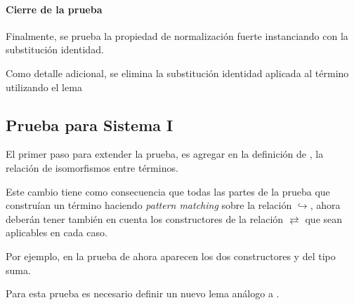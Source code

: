 

\begin{samepage}
\end{samepage}


\paragraph{Cierre de la prueba}

Finalmente, se prueba la propiedad de normalización fuerte instanciando  con la substitución identidad.

Como detalle adicional, se elimina la substitución identidad aplicada al término utilizando el lema
\AgdaSymbol{:}
\AgdaSymbol{\}}
\AgdaSymbol{\{}
\AgdaSymbol{:}
\AgdaSymbol{\}}



\subsection{Prueba para Sistema I}

El primer paso para extender la prueba, es agregar en la definición de , la relación de isomorfismos entre términos.


Este cambio tiene como consecuencia que todas las partes de la prueba que construían un término \snstar haciendo \textit{pattern matching} sobre la relación $\hookrightarrow$, ahora deberán tener también en cuenta los constructores de la relación $\rightleftarrows$ que sean aplicables en cada caso.

Por ejemplo, en la prueba de  ahora aparecen los dos constructores  y  del tipo suma.


Para esta prueba es necesario definir un nuevo lema análogo a .

